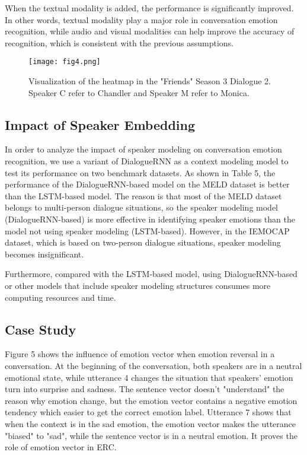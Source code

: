 \documentclass[11pt]{article}
\begin{document}
When the textual modality is added, the performance is significantly improved. In other words, textual modality play a major role in conversation emotion recognition, while audio and visual modalities can help improve the accuracy of recognition, which is consistent with the previous assumptions.
\begin{figure}[t]
	\centering
	\texttt{[image: fig4.png]} 
	\caption{Visualization of the heatmap in the "Friends" Season 3 Dialogue 2. Speaker C refer to Chandler and Speaker M refer to Monica.}
	\label{fig4}
\end{figure}

\subsection{Impact of Speaker Embedding}
In order to analyze the impact of speaker modeling on conversation emotion recognition, we use a variant of DialogueRNN as a context modeling model to test its performance on two benchmark datasets. As shown in Table 5, the performance of the DialogueRNN-based model on the MELD dataset is better than the LSTM-based model. The reason is that most of the MELD dataset belongs to multi-person dialogue situations, so the speaker modeling model (DialogueRNN-based) is more effective in identifying speaker emotions than the model not using speaker modeling (LSTM-based). However, in the IEMOCAP dataset, which is based on two-person dialogue situations, speaker modeling becomes insignificant.

Furthermore, compared with the LSTM-based model, using DialogueRNN-based or other models that include speaker modeling structures consumes more computing resources and time.

\subsection{Case Study}
Figure 5 shows the influence of emotion vector when emotion reversal in a conversation. At the beginning of the conversation, both speakers are in a neutral emotional state, while utterance 4 changes the situation that speakers' emotion turn into surprise and sadness. The sentence vector doesn't "understand" the reason why emotion change, but the emotion vector contains a negative emotion tendency which easier to get the correct emotion label. Utterance 7 shows that when the context is in the sad emotion, the emotion vector makes the utterance "biased" to "sad", while the sentence vector is in a neutral emotion. It proves the role of emotion vector in ERC.
\end{document}
